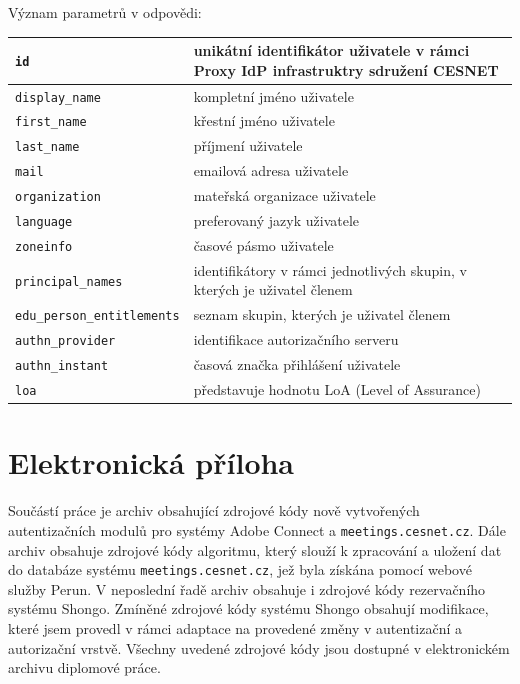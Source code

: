 \documentclass[
  printed, %
  twoside, %
  table,   %
  nolof,     %
  nolot,     %
]{fithesis3}
\begin{document}
\noindent
Význam parametrů v odpovědi:
\label{table:userinfo:resp}
\begin{table}[H]
\begin{tabular}{|l|l|}
\hline
\texttt{id}                         &   \parbox[t]{6.8cm}{unikátní identifikátor uživatele v rámci Proxy IdP infrastruktry sdružení CESNET}  \\ \hline
\texttt{display\_name}              & \parbox[t]{6.8cm}{kompletní jméno uživatele}  \\ \hline
\texttt{first\_name}                & \parbox[t]{6.8cm}{křestní jméno uživatele}  \\ \hline
\texttt{last\_name}                 & \parbox[t]{6.8cm}{příjmení uživatele}  \\ \hline
\texttt{mail}  & \parbox[t]{6.8cm}{emailová adresa uživatele}  \\ \hline
\texttt{organization}               & \parbox[t]{6.8cm}{mateřská organizace uživatele}  \\ \hline
\texttt{language}                   & \parbox[t]{6.8cm}{preferovaný jazyk uživatele}  \\ \hline
\texttt{zoneinfo}                   & \parbox[t]{6.8cm}{časové pásmo uživatele}  \\ \hline
\texttt{principal\_names}           & \parbox[t]{6.8cm}{identifikátory v rámci jednotlivých skupin, v kterých je uživatel členem}  \\ \hline
\texttt{edu\_person\_entitlements}  & \parbox[t]{6.8cm}{seznam skupin, kterých je uživatel členem}  \\ \hline
\texttt{authn\_provider}            & \parbox[t]{6.8cm}{identifikace autorizačního serveru}  \\ \hline
\texttt{authn\_instant}             & \parbox[t]{6.8cm}{časová značka přihlášení uživatele}  \\ \hline
\texttt{loa}                        & \parbox[t]{6.8cm}{představuje hodnotu LoA (Level of Assurance)}  \\ \hline

\end{tabular}
\end{table}

\chapter{Elektronická příloha}
Součástí práce je archiv obsahující zdrojové kódy nově vytvořených autentizačních modulů pro systémy Adobe Connect a \texttt{meetings.cesnet.cz}. Dále archiv obsahuje zdrojové kódy algoritmu, který slouží k zpracování a uložení dat do databáze systému \texttt{meetings.cesnet.cz}, jež byla získána pomocí webové služby Perun. V neposlední řadě archiv obsahuje i zdrojové kódy rezervačního systému Shongo. Zmíněné zdrojové kódy systému Shongo obsahují modifikace, které jsem provedl v rámci adaptace na provedené změny v autentizační a autorizační vrstvě. Všechny uvedené zdrojové kódy jsou dostupné v elektronickém archivu diplomové práce. 
\end{document}
